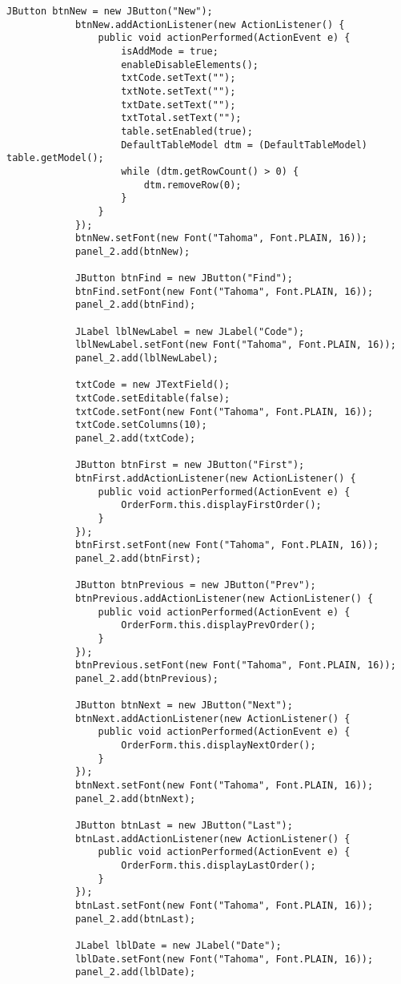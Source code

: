 \begin{lstlisting}[style=JavaStyle]
			JButton btnNew = new JButton("New");
			btnNew.addActionListener(new ActionListener() {
				public void actionPerformed(ActionEvent e) {
					isAddMode = true;
					enableDisableElements();
					txtCode.setText("");
					txtNote.setText("");
					txtDate.setText("");
					txtTotal.setText("");
					table.setEnabled(true);
					DefaultTableModel dtm = (DefaultTableModel) table.getModel();
					while (dtm.getRowCount() > 0) {
						dtm.removeRow(0);
					}
				}
			});
			btnNew.setFont(new Font("Tahoma", Font.PLAIN, 16));
			panel_2.add(btnNew);
			
			JButton btnFind = new JButton("Find");
			btnFind.setFont(new Font("Tahoma", Font.PLAIN, 16));
			panel_2.add(btnFind);
			
			JLabel lblNewLabel = new JLabel("Code");
			lblNewLabel.setFont(new Font("Tahoma", Font.PLAIN, 16));
			panel_2.add(lblNewLabel);
			
			txtCode = new JTextField();
			txtCode.setEditable(false);
			txtCode.setFont(new Font("Tahoma", Font.PLAIN, 16));
			txtCode.setColumns(10);
			panel_2.add(txtCode);
			
			JButton btnFirst = new JButton("First");
			btnFirst.addActionListener(new ActionListener() {
				public void actionPerformed(ActionEvent e) {
					OrderForm.this.displayFirstOrder();
				}
			});
			btnFirst.setFont(new Font("Tahoma", Font.PLAIN, 16));
			panel_2.add(btnFirst);
			
			JButton btnPrevious = new JButton("Prev");
			btnPrevious.addActionListener(new ActionListener() {
				public void actionPerformed(ActionEvent e) {
					OrderForm.this.displayPrevOrder();
				}
			});
			btnPrevious.setFont(new Font("Tahoma", Font.PLAIN, 16));
			panel_2.add(btnPrevious);
			
			JButton btnNext = new JButton("Next");
			btnNext.addActionListener(new ActionListener() {
				public void actionPerformed(ActionEvent e) {
					OrderForm.this.displayNextOrder();
				}
			});
			btnNext.setFont(new Font("Tahoma", Font.PLAIN, 16));
			panel_2.add(btnNext);
			
			JButton btnLast = new JButton("Last");
			btnLast.addActionListener(new ActionListener() {
				public void actionPerformed(ActionEvent e) {
					OrderForm.this.displayLastOrder();
				}
			});
			btnLast.setFont(new Font("Tahoma", Font.PLAIN, 16));
			panel_2.add(btnLast);
			
			JLabel lblDate = new JLabel("Date");
			lblDate.setFont(new Font("Tahoma", Font.PLAIN, 16));
			panel_2.add(lblDate);
			

\end{lstlisting}
